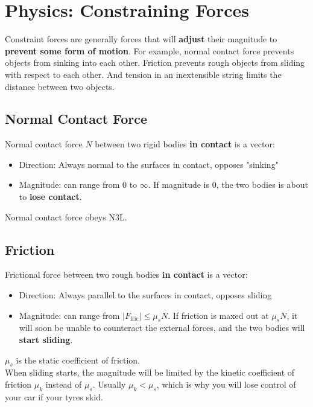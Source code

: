 \documentclass{article}
\begin{document}
\section{Physics: Constraining Forces}
Constraint forces are generally forces that will \textbf{adjust} their magnitude to \textbf{prevent some form of motion}. For example, normal contact force prevents objects from sinking into each other. Friction prevents rough objects from sliding with respect to each other. And tension in an inextensible string limits the distance between two objects. 
\subsection{Normal Contact Force}
Normal contact force $N$ between two rigid bodies \textbf{in contact} is a vector:
\begin{itemize}
    \item Direction: Always normal to the surfaces in contact, opposes "sinking"
    \item Magnitude: can range from $0$ to $\infty$. If magnitude is $0$, the two bodies is about to \textbf{lose contact}.
\end{itemize}
Normal contact force obeys N3L.
\subsection{Friction}
Frictional force between two rough bodies \textbf{in contact} is a vector: 
\begin{itemize}
    \item Direction: Always parallel to the surfaces in contact, opposes sliding
    \item Magnitude: can range from $|F_{\text{fric}}| \leq \mu_s N$. If friction is maxed out at $\mu_s N$, it will soon be unable to counteract the external forces, and the two bodies will \textbf{start sliding}.
\end{itemize}
$\mu_s$ is the static coefficient of friction. \\[10pt]
When sliding starts, the magnitude will be limited by the kinetic coefficient of friction $\mu_k$ instead of $\mu_s$. Usually $\mu_k < \mu_s$, which is why you will lose control of your car if your tyres skid.
\end{document}
